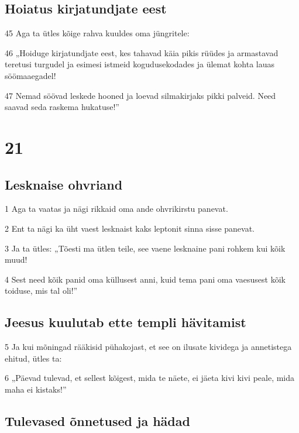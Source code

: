 \section*{Hoiatus kirjatundjate eest}

\par 45 Aga ta ütles kõige rahva kuuldes oma jüngritele:
\par 46 „Hoiduge kirjatundjate eest, kes tahavad käia pikis rüüdes ja armastavad teretusi turgudel ja esimesi istmeid kogudusekodades ja ülemat kohta lauas söömaaegadel!
\par 47 Nemad söövad leskede hooned ja loevad silmakirjaks pikki palveid. Need saavad seda raskema hukatuse!”


\chapter{21}

\section*{Lesknaise ohvriand}

\par 1 Aga ta vaatas ja nägi rikkaid oma ande ohvrikirstu panevat.
\par 2 Ent ta nägi ka üht vaest lesknaist kaks leptonit sinna sisse panevat.
\par 3 Ja ta ütles: „Tõesti ma ütlen teile, see vaene lesknaine pani rohkem kui kõik muud!
\par 4 Sest need kõik panid oma küllusest anni, kuid tema pani oma vaesusest kõik toiduse, mis tal oli!”
\section*{Jeesus kuulutab ette templi hävitamist}

\par 5 Ja kui mõningad rääkisid pühakojast, et see on ilusate kividega ja annetistega ehitud, ütles ta:
\par 6 „Päevad tulevad, et sellest kõigest, mida te näete, ei jäeta kivi kivi peale, mida maha ei kistaks!”

\section*{Tulevased õnnetused ja hädad}

